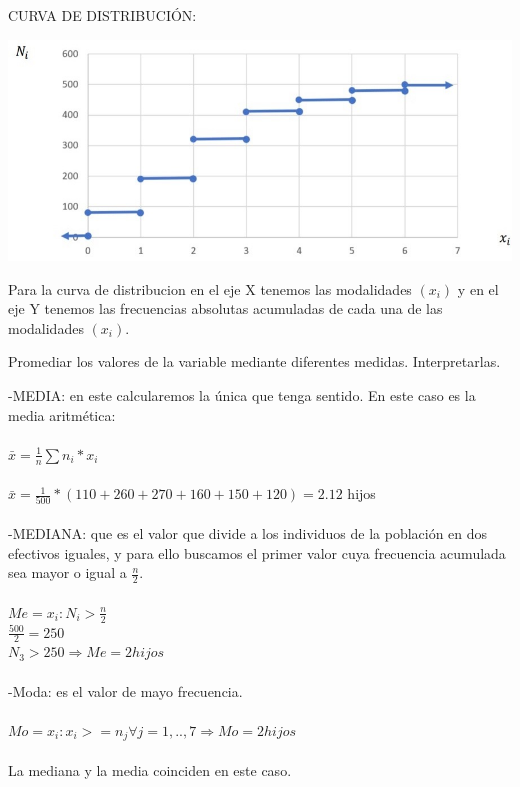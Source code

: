 \begin{center}

CURVA DE DISTRIBUCIÓN:
\begin{center}
	\includegraphics[scale=0.5]{curva-distribucion-ej-1.jpeg}
\end{center}
Para la curva de distribucion en el eje X tenemos las modalidades $(x_{i})$ y en el eje Y tenemos las frecuencias absolutas acumuladas de cada una de las modalidades $(x_{i})$. 
\end{center}
	 \begin{flushleft}
\subproblem
Promediar los valores de la variable mediante diferentes medidas. Interpretarlas.
\end{flushleft}
-MEDIA: en este calcularemos la única que tenga sentido. En este caso es la media aritmética: 
\\
\\
$\bar{x} = \frac{1}{n}  \sum   n_{i} * x_{i}$ 
\\
\\
$\bar{x} = \frac{1}{500} * (110 + 260 +270 + 160 + 150 + 120) = 2.12 $ hijos
\\
\\
-MEDIANA: que es el valor que divide a los individuos de la población en dos efectivos iguales, y para ello buscamos el primer valor cuya frecuencia acumulada sea mayor o igual a $\frac{n}{2}$.
\\
\\
$Me = x_{i} : N_{i} > \frac{n}{2}$
\\

$\frac{500}{2} = 250$ 
\\

$N_{3} > 250  \Rightarrow Me = 2 hijos  $
\\
\\
-Moda: es el valor de mayo frecuencia.
\\
\\
$Mo = x_{i} :x_{i} >= n_{j} \forall j=1,..,7  \Rightarrow Mo = 2 hijos$
\\
\\
\textrightarrow La mediana y la media coinciden en este caso.
\\
\\